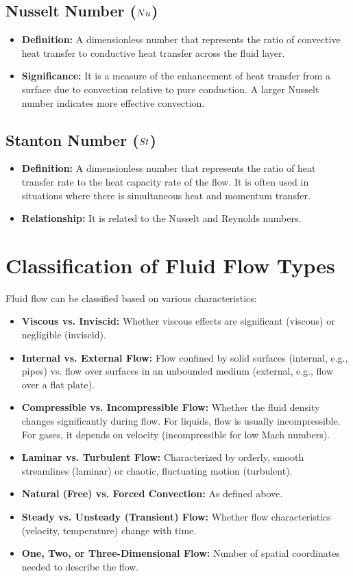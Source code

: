 \subsection{Nusselt Number ($Nu$)}
\begin{itemize}
    \item \textbf{Definition:} A dimensionless number that represents the ratio of convective heat transfer to conductive heat transfer across the fluid layer.
    \item \textbf{Significance:} It is a measure of the enhancement of heat transfer from a surface due to convection relative to pure conduction. A larger Nusselt number indicates more effective convection.
\end{itemize}

\subsection{Stanton Number ($St$)}
\begin{itemize}
    \item \textbf{Definition:} A dimensionless number that represents the ratio of heat transfer rate to the heat capacity rate of the flow. It is often used in situations where there is simultaneous heat and momentum transfer.
    \item \textbf{Relationship:} It is related to the Nusselt and Reynolds numbers.
\end{itemize}

\section{Classification of Fluid Flow Types}
Fluid flow can be classified based on various characteristics:
\begin{itemize}
    \item \textbf{Viscous vs. Inviscid:} Whether viscous effects are significant (viscous) or negligible (inviscid).
    \item \textbf{Internal vs. External Flow:} Flow confined by solid surfaces (internal, e.g., pipes) vs. flow over surfaces in an unbounded medium (external, e.g., flow over a flat plate).
    \item \textbf{Compressible vs. Incompressible Flow:} Whether the fluid density changes significantly during flow. For liquids, flow is usually incompressible. For gases, it depends on velocity (incompressible for low Mach numbers).
    \item \textbf{Laminar vs. Turbulent Flow:} Characterized by orderly, smooth streamlines (laminar) or chaotic, fluctuating motion (turbulent).
    \item \textbf{Natural (Free) vs. Forced Convection:} As defined above.
    \item \textbf{Steady vs. Unsteady (Transient) Flow:} Whether flow characteristics (velocity, temperature) change with time.
    \item \textbf{One, Two, or Three-Dimensional Flow:} Number of spatial coordinates needed to describe the flow.
\end{itemize}

